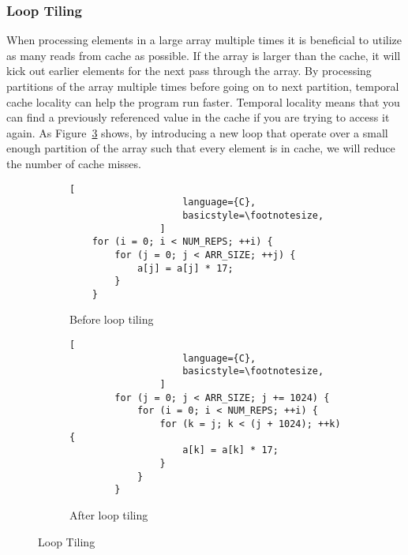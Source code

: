 \subsubsection{Loop Tiling}
When processing elements in a large array multiple times it is beneficial to utilize as many reads from cache as possible. If the array is larger than the cache, it will kick out earlier elements for the next pass through the array. By processing partitions of the array multiple times before going on to next partition, temporal cache locality can help the program run faster. Temporal locality means that you can find a previously referenced value in the cache if you are trying to access it again. As Figure~\ref{fig:loop:tiling} shows, by introducing a new loop that operate over a small enough partition of the array such that every element is in cache, we will reduce the number of cache misses.

\begin{figure}[h]
    \begin{adjustbox}{minipage=\linewidth,scale=0.8}
        \begin{subfigure}{.50\textwidth}
            \centering
            \begin{lstlisting}[
                    language={C},
                    basicstyle=\footnotesize,
                ]
    for (i = 0; i < NUM_REPS; ++i) {
        for (j = 0; j < ARR_SIZE; ++j) {
            a[j] = a[j] * 17;
        }
    }
                \end{lstlisting}
            \caption{Before loop tiling}
            \label{fig:tiling:sub1}
        \end{subfigure}%
        \begin{subfigure}{.50\textwidth}
            \centering
            \begin{lstlisting}[
                    language={C},
                    basicstyle=\footnotesize,
                ]
        for (j = 0; j < ARR_SIZE; j += 1024) {
            for (i = 0; i < NUM_REPS; ++i) {
                for (k = j; k < (j + 1024); ++k) {
                    a[k] = a[k] * 17;
                }
            }
        }
                \end{lstlisting}
            \caption{After loop tiling}
            \label{fig:tiling:sub2}
        \end{subfigure}
    \end{adjustbox}
    \caption{Loop Tiling}
    \label{fig:loop:tiling}
\end{figure}


